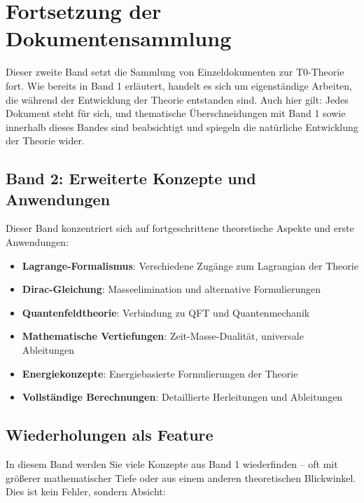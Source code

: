 \section*{Fortsetzung der Dokumentensammlung}

Dieser zweite Band setzt die Sammlung von Einzeldokumenten zur T0-Theorie fort. Wie bereits in Band 1 erläutert, handelt es sich um eigenständige Arbeiten, die während der Entwicklung der Theorie entstanden sind. Auch hier gilt: Jedes Dokument steht für sich, und thematische Überschneidungen mit Band 1 sowie innerhalb dieses Bandes sind beabsichtigt und spiegeln die natürliche Entwicklung der Theorie wider.

\subsection*{Band 2: Erweiterte Konzepte und Anwendungen}

Dieser Band konzentriert sich auf fortgeschrittene theoretische Aspekte und erste Anwendungen:

\begin{itemize}
\item \textbf{Lagrange-Formalismus}: Verschiedene Zugänge zum Lagrangian der Theorie
\item \textbf{Dirac-Gleichung}: Masseelimination und alternative Formulierungen
\item \textbf{Quantenfeldtheorie}: Verbindung zu QFT und Quantenmechanik
\item \textbf{Mathematische Vertiefungen}: Zeit-Masse-Dualität, universale Ableitungen
\item \textbf{Energiekonzepte}: Energiebasierte Formulierungen der Theorie
\item \textbf{Vollständige Berechnungen}: Detaillierte Herleitungen und Ableitungen
\end{itemize}

\subsection*{Wiederholungen als Feature}

In diesem Band werden Sie viele Konzepte aus Band 1 wiederfinden -- oft mit größerer mathematischer Tiefe oder aus einem anderen theoretischen Blickwinkel. Dies ist kein Fehler, sondern Absicht:

